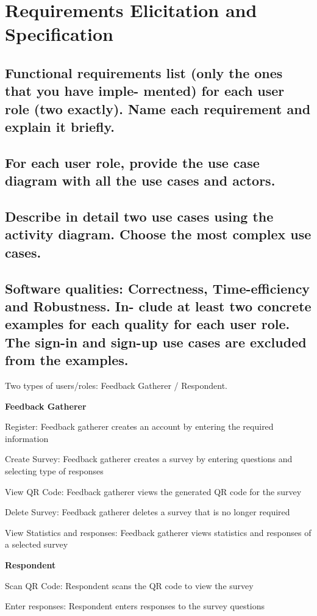 \documentclass[letterpaper, 10 pt, conference]{ieeeconf}
\begin{document}
\section{Requirements Elicitation and Specification}
\subsection{Functional requirements list (only the ones that you have imple- mented) for each user role (two exactly). Name each requirement and explain it briefly.}
\subsection{For each user role, provide the use case diagram with all the use cases and actors.}
\subsection{Describe in detail two use cases using the activity diagram. Choose the most complex use cases.}
\subsection{Software qualities: Correctness, Time-eﬀiciency and Robustness. In- clude at least two concrete examples for each quality for each user role. The sign-in and sign-up use cases are excluded from the examples.
}

Two types of users/roles: Feedback Gatherer / Respondent.

\textbf{Feedback Gatherer}
    
    Register: Feedback gatherer creates an account by entering the required information
    
    Create Survey: Feedback gatherer creates a survey by entering questions and selecting type of responses
    
    View QR Code: Feedback gatherer views the generated QR code for the survey
    
    Delete Survey: Feedback gatherer deletes a survey that is no longer required
    
    View Statistics and responses: Feedback gatherer views statistics and responses of a selected survey
    
\textbf{Respondent}
    
    Scan QR Code: Respondent scans the QR code to view the survey
    
    Enter responses: Respondent enters responses to the survey questions
    
\end{document}
